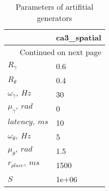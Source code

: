 \begin{longtable}{ll}
\caption{Parameters of artifitial generators}\label{ArtifitialPlaceCell_parameters}\\
\toprule
{} & ca3\_spatial \\
\midrule
\endhead
\midrule
\multicolumn{2}{r}{{Continued on next page}} \\
\midrule
\endfoot

\bottomrule
\endlastfoot
$R_{\gamma}$         &         0.6 \\
$R_{\theta}$         &         0.4 \\
$\omega_{\gamma},\ Hz$     &          30 \\
$\mu_{\gamma},\ rad$        &           0 \\
$latency,\ ms$        &          10 \\
$\omega_{\theta},\ Hz$      &           5 \\
$\mu_{\theta},\ rad$         &         1.5 \\
$r_{place}, \ ms$ &        1500 \\
$S$     &       1e+06 \\
\end{longtable}
